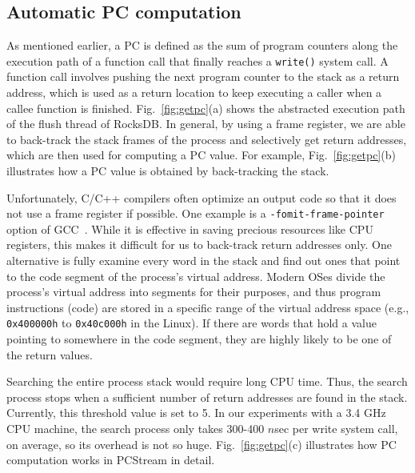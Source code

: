 \vspace{-5pt}
\subsection{Automatic PC computation}
As mentioned earlier, a PC is defined as the sum of program counters along the
execution path of a function call that finally reaches a \texttt{write()}
system call.  A function call involves pushing the next program counter to the
stack as a return address, which is used as a return location to keep
executing a caller when a callee function is finished.  
Fig.~\ref{fig:getpc}(a) shows the abstracted execution path of the flush thread
of RocksDB.
In general, by
using a frame register, we are able to back-track the stack frames of the
process and selectively get return addresses, which are then used for
computing a PC value. For example, Fig.~\ref{fig:getpc}(b) illustrates how a PC
value is obtained by back-tracking the stack. 

Unfortunately, C/C++ compilers often optimize an output code so
that it does not use a frame register if possible.  One example is a
{\tt -fomit-frame-pointer} option of GCC~\cite{GCC}. 
While it is effective in saving
precious resources like CPU registers, this makes it difficult for us to
back-track return addresses only. One alternative is fully examine
every word in the stack and find out ones that point to the code
segment of the process's virtual address.  Modern OSes divide the process's
virtual address into segments for their purposes, and thus program instructions
(code) are stored in a specific range of the virtual address space (e.g.,
{\texttt{0x400000h}} to {\texttt{0x40c000h}} in the
Linux).  If there are words that hold a value pointing to somewhere in the code
segment, they are highly likely to be one of the return values.  

Searching the entire process stack would require long CPU time. Thus, the
search process stops when a sufficient number of return addresses are found in
the stack. Currently, this threshold value is set to 5.  In our experiments
with a 3.4 GHz CPU machine, the search process only takes 300-400 $n$sec per
write system call, on average, so its overhead is not so huge.
Fig.~\ref{fig:getpc}(c) illustrates how PC computation works in {\sf PCStream}
in detail.


